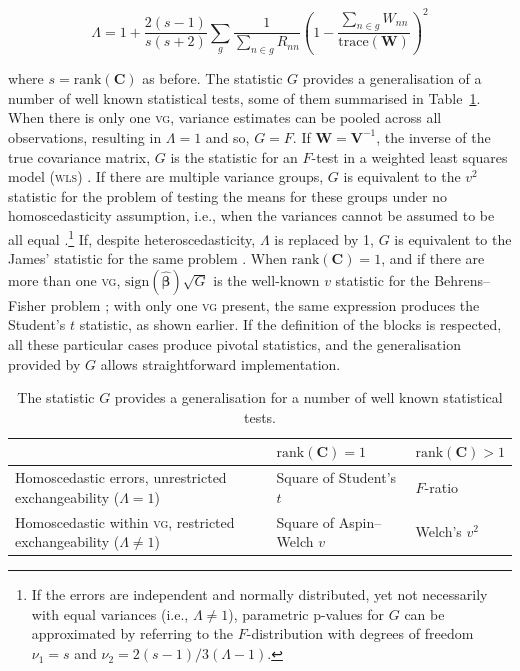 \begin{equation}
\Lambda = 1+\frac{2(s-1)}{s(s+2)}\sum_{g} \frac{1}{\sum_{n \in g}R_{nn}} \left(1-\frac{\sum_{n \in g}W_{nn}}{\mathrm{trace}\left(\mathbf{W}\right)}\right)^2
\end{equation}

\noindent
where $s=\mathrm{rank}\left(\mathbf{C}\right)$ as before. The statistic $G$ provides a generalisation of a number of well known statistical tests, some of them summarised in Table~\ref{tab:perm:G}. When there is only one \textsc{vg}, variance estimates can be pooled across all observations, resulting in $\Lambda=1$ and so, $G=F$. If $\mathbf{W}=\mathbf{V}^{-1}$, the inverse of the true covariance matrix, $G$ is the statistic for an $F$-test in a weighted least squares model (\textsc{wls}) \citep{Christensen2002}. If there are multiple variance groups, $G$ is equivalent to the $v^2$ statistic for the problem of testing the means for these groups under no homoscedasticity assumption, i.e., when the variances cannot be assumed to be all equal \citep{Welch1951}.\footnote{If the errors are independent and normally distributed, yet not necessarily with equal variances (i.e., $\Lambda \neq 1$), parametric p-values for $G$ can be approximated by referring to the $F$-distribution with degrees of freedom $\nu_1=s$ and $\nu_2=2(s-1)/3(\Lambda-1)$.} If, despite heteroscedasticity, $\Lambda$ is replaced by 1, $G$ is equivalent to the James' statistic for the same problem \citep{James1951}. When $\mathrm{rank}\left(\mathbf{C}\right) = 1$, and if there are more than one \textsc{vg}, $\mathrm{sign}(\boldsymbol{\hat{\beta}})\sqrt{G}$ is the well-known $v$ statistic for the Behrens--Fisher problem \citep{Fisher1935_fid, Aspin1949}; with only one \textsc{vg} present, the same expression produces the Student's $t$ statistic, as shown earlier. If the definition of the blocks is respected, all these particular cases produce pivotal statistics, and the generalisation provided by $G$ allows straightforward implementation.

\begin{table}[!t]
\caption[Some tests of which the statistic $G$ is a generalisation.]{The statistic $G$ provides a generalisation for a number of well known statistical tests.}
\begin{center}
{\small
\begin{tabular}{@{}m{70mm}<{\raggedright}@{}m{25mm}<{\centering}m{25mm}<{\centering}@{}}
\toprule
{} & $\mathrm{rank}\left(\mathbf{C}\right) = 1$ & $\mathrm{rank}\left(\mathbf{C}\right) > 1$ \\
\midrule
Homoscedastic errors, unrestricted exchangeability ($\Lambda = 1$) & Square of Student's $t$ & $F$-ratio \\
\midrule
Homoscedastic within \textsc{vg}, restricted exchangeability ($\Lambda \neq 1$) & Square of Aspin--Welch $v$ & Welch's $v^2$\\
\bottomrule
\end{tabular}}
\end{center}
\label{tab:perm:G}
\end{table}

